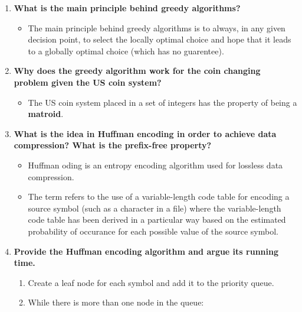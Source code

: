 \documentclass[a4paper,11pt]{article}
\begin{document}
\begin{enumerate}
\def\labelenumi{\arabic{enumi}.}
\item
  \textbf{What is the main principle behind greedy algorithms?}

  \begin{itemize}
  \itemsep1pt\parskip0pt
  \item
    The main principle behind greedy algorithms is to always, in any
    given decision point, to select the locally optimal choice and hope
    that it leads to a globally optimal choice (which has no guarentee).
  \end{itemize}
\item
  \textbf{Why does the greedy algorithm work for the coin changing
  problem given the US coin system?}

  \begin{itemize}
  \itemsep1pt\parskip0pt
  \item
    The US coin system placed in a set of integers has the property of
    being a \textbf{matroid}.
  \end{itemize}
\item
  \textbf{What is the idea in Huffman encoding in order to achieve data
  compression? What is the prefix-free property?}

  \begin{itemize}
  \itemsep1pt\parskip0pt
  \item
    Huffman oding is an entropy encoding algorithm used for lossless
    data compression.
  \item
    The term refers to the use of a variable-length code table for
    encoding a source symbol (such as a character in a file) where the
    variable-length code table has been derived in a particular way
    based on the estimated probability of occurance for each possible
    value of the source symbol.
  \end{itemize}
\item
  \textbf{Provide the Huffman encoding algorithm and argue its running
  time.}

  \begin{enumerate}
  \def\labelenumii{\arabic{enumii}.}
  \itemsep1pt\parskip0pt
  \item
    Create a leaf node for each symbol and add it to the priority queue.
  \item
    While there is more than one node in the queue:


\end{enumerate}
\end{enumerate}
\end{document}
